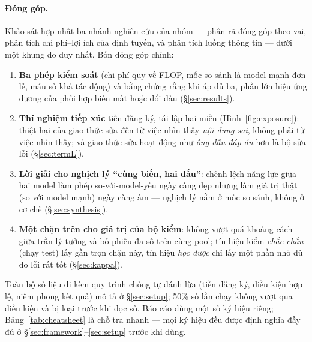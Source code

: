 \documentclass[12pt,a4paper]{article}
\begin{document}
\paragraph{Đóng góp.} Khảo sát hợp nhất ba nhánh nghiên cứu của nhóm --- phân rã đóng góp theo
vai, phân tích chi phí--lợi ích của định tuyến, và phân tích luồng thông tin --- dưới một khung
đo duy nhất. Bốn đóng góp chính:
\begin{enumerate}\itemsep2pt
  \item \textbf{Ba phép kiểm soát} (chi phí quy về FLOP, mốc so sánh là model mạnh đơn lẻ, mẫu
        số khả tác động) và bằng chứng rằng khi áp đủ ba, phần lớn hiệu ứng dương của phối hợp
        biến mất hoặc đổi dấu (\S\ref{sec:results}).
  \item \textbf{Thí nghiệm tiếp xúc} tiền đăng ký, tái lập hai miền (Hình~\ref{fig:exposure}):
        thiệt hại của giao thức sửa đến từ việc nhìn thấy \emph{nội dung sai}, không phải từ
        việc nhìn thấy; và giao thức sửa hoạt động như \emph{ống dẫn đáp án} hơn là bộ sửa lỗi
        (\S\ref{sec:termL}).
  \item \textbf{Lời giải cho nghịch lý ``cùng biến, hai dấu''}: chênh lệch năng lực giữa hai
        model làm phép so-với-model-yếu ngày càng đẹp nhưng làm giá trị thật (so với model mạnh)
        ngày càng âm --- nghịch lý nằm ở mốc so sánh, không ở cơ chế (\S\ref{sec:synthesis}).
  \item \textbf{Một chặn trên cho giá trị của bộ kiểm}: không vượt quá khoảng cách giữa trần
        lý tưởng và bỏ phiếu đa số trên cùng pool; tín hiệu kiểm \emph{chắc chắn} (chạy test)
        lấy gần trọn chặn này, tín hiệu \emph{học được} chỉ lấy một phần nhỏ dù đo lỗi rất tốt
        (\S\ref{sec:kappa}).
\end{enumerate}
Toàn bộ số liệu đi kèm quy trình chống tự đánh lừa (tiền đăng ký, điều kiện hợp lệ, niêm phong
kết quả) mô tả ở \S\ref{sec:setup}; 50\% số lần chạy không vượt qua điều kiện và bị loại trước
khi đọc số. Báo cáo dùng một số ký hiệu riêng; Bảng~\ref{tab:cheatsheet} là chỗ tra nhanh ---
mọi ký hiệu đều được định nghĩa đầy đủ ở \S\ref{sec:framework}--\ref{sec:setup} trước khi
dùng.
\end{document}
